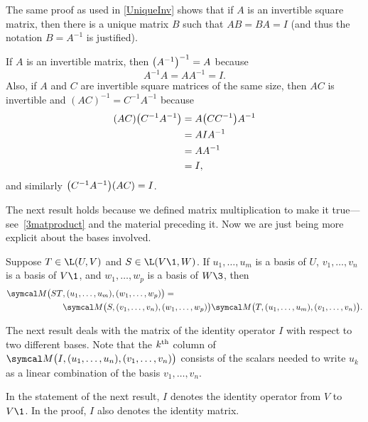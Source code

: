 
The same proof as used in \ref{UniqueInv} shows that if $A$ is an invertible square matrix, then there is a unique matrix $B$ such that $AB = BA = I$ (and thus the notation $B = A^{-1}$ is justified).

If $A$ is an invertible matrix, then ${\paren[\big]{A^{-1}}}^{-1} = A$ because
\[
A^{-1} A = A A^{-1} = I.
\]
Also, if $A$ and $C$ are invertible square matrices of the same size, then $AC$ is invertible and $(AC)^{-1} = C^{-1} A^{-1}$ because
\begin{align*}
(AC) \paren[\big] {C^{-1} A^{-1}} &= A \paren[\big]{ C C^{-1} } A^{-1} \\
&= AIA^{-1} \\
&= A A^{-1} \\
&= I,
\end{align*}
and similarly $\paren[\big] {C^{-1} A^{-1}}(AC) = I$.

The next result holds because we defined matrix multiplication to
make it true---see~\ref{3matproduct} and the material preceding it. Now we are just being more explicit about the bases involved.

{Suppose $T \in \L(U, V)$ and $S \in \L(V\1, W)$. If $u_1, \dots, u_m$ is a basis of $U$, $v_1, \dots, v_n$ is a basis of $V\1$, and
$w_1, \dots, w_p$ is a basis of $W\3$, then
\begin{align*}
\M\bigl(ST&, (u_1, \dots, u_m), (w_1, \dots, w_p) \bigr) = \\
&\M\bigl(S, (v_1, \dots, v_n), (w_1, \dots, w_p) \bigr)
\M\bigl(T, (u_1, \dots, u_m), (v_1, \dots, v_n) \bigr).
\end{align*}}

The next result deals with the matrix of the identity operator $I$ with respect to two different bases.  Note that the $k^{\nth}$ column of
$\M\bigl(I, (u_1, \dots, u_n), (v_1, \dots, v_n)\bigr)$ consists of the scalars needed to write $u_k$ as a linear combination of the basis
$v_1, \dots, v_n$.

In the statement of the next result, $I$ denotes the identity operator from $V$ to $V\1$. In the proof, $I$ also denotes the  identity matrix.



